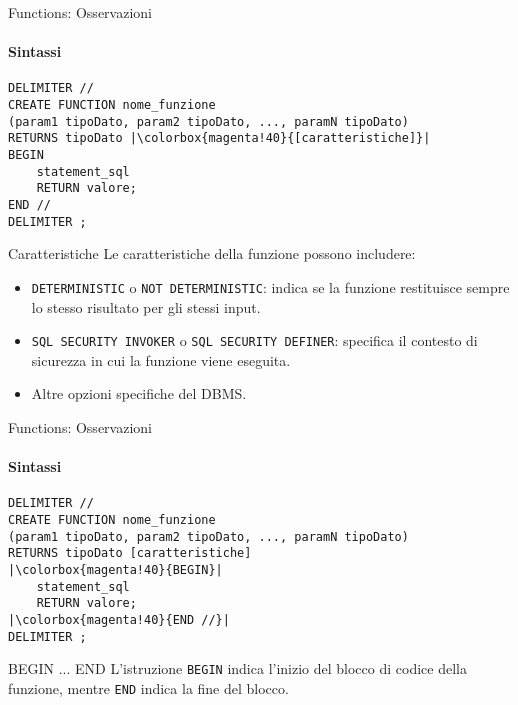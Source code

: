 %
\begin{frame}[fragile]{Functions: Osservazioni}
\framesubtitle{Sintassi}
\vspace{-.9cm}
\begin{lstlisting}
DELIMITER //
CREATE FUNCTION nome_funzione
(param1 tipoDato, param2 tipoDato, ..., paramN tipoDato)
RETURNS tipoDato |\colorbox{magenta!40}{[caratteristiche]}|
BEGIN
    statement_sql
    RETURN valore;
END //
DELIMITER ;
\end{lstlisting}

\vspace{-.4cm}

\begin{minipage}{\textwidth}
    \scriptsize
    \begin{block}{\small Caratteristiche}
    Le caratteristiche della funzione possono includere:
    \begin{itemize}
        \item \texttt{DETERMINISTIC} o \texttt{NOT DETERMINISTIC}: indica se la funzione restituisce sempre lo stesso risultato per gli stessi input.
        \item \texttt{SQL SECURITY INVOKER} o \texttt{SQL SECURITY DEFINER}: specifica il contesto di sicurezza in cui la funzione viene eseguita.
        \item Altre opzioni specifiche del DBMS.
    \end{itemize}
    \end{block}
    \end{minipage}
\end{frame}
%
\begin{frame}[fragile]{Functions: Osservazioni}
\framesubtitle{Sintassi}
\vspace{-.6cm}
\begin{lstlisting}
DELIMITER //
CREATE FUNCTION nome_funzione
(param1 tipoDato, param2 tipoDato, ..., paramN tipoDato)
RETURNS tipoDato [caratteristiche]
|\colorbox{magenta!40}{BEGIN}|
    statement_sql
    RETURN valore;
|\colorbox{magenta!40}{END //}|
DELIMITER ;
\end{lstlisting}
\begin{minipage}{\textwidth}
    \begin{block}{BEGIN ... END}
    L'istruzione \texttt{BEGIN} indica l'inizio del blocco di codice della funzione, mentre \texttt{END} indica la fine del blocco.
    \end{block}
    \end{minipage}
\end{frame}
%
